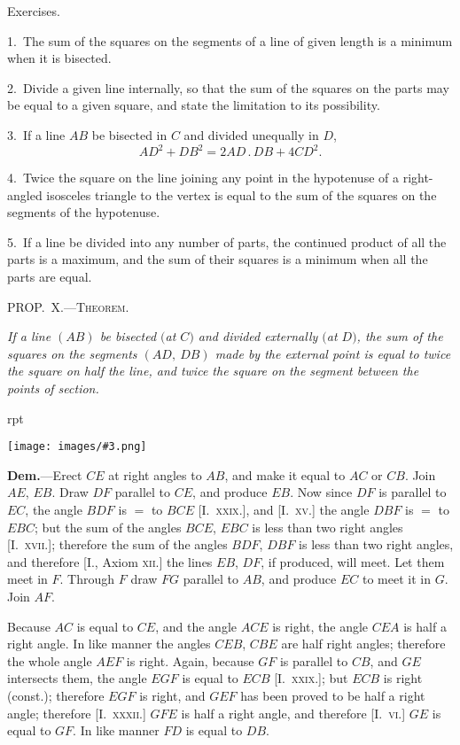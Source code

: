 \documentclass[oneside]{book}
\newcounter{wrapwidth}
\newcommand\mypropl[2]{
\bigskip\Needspace*{4\baselineskip}\begin{center}\textsc{#1}\end{center}
\hspace{\parindent}\emph{#2}\par\medskip
}
\newcommand\exhead[1]{
\Needspace*{5\baselineskip}\begin{center}
\textsf{#1}
\end{center}
}
\newcommand\imgflow[3]{
\setcounter{wrapwidth}{#1}
\begin{wrapfigure}[#2]{r}{\value{wrapwidth}pt}
\begin{center}
\vspace{-0.3in}
\texttt{[image: images/\#3.png]}
\end{center}
\end{wrapfigure}
}
\begin{document}


\exhead{Exercises.}

\begin{footnotesize}
1.~The sum of the squares on the segments of a line of given
length is a minimum when it is bisected.

2.~Divide a given line internally, so that the sum of the squares
on the parts may be equal to a given square, and state the limitation
to its possibility.

3.~If a line $AB$ be bisected in $C$ and divided unequally in $D$,
\[
  AD^2 + DB^2 =  2AD\,.\,DB + 4CD^2.
\]

4.~Twice the square on the line joining any point in the hypotenuse
of a right-angled isosceles triangle to the vertex is equal to
the sum of the squares on the segments of the hypotenuse.

5.~If a line be divided into any number of parts, the continued
product of all the parts is a maximum, and the sum of their squares
is a minimum when all the parts are equal.
\par\end{footnotesize}


\mypropl{PROP\@.~X.---Theorem.}{If a line $(AB)$ be bisected $($at $C)$ and divided externally
$($at $D)$, the sum of the squares on the segments $(AD,\ DB)$
made by the external point is equal to twice the square on
half the line, and twice the square on the segment between
the points of section.}

\imgflow{184}{11}{f092}

\textbf{Dem.}---Erect $CE$ at right angles to $AB$, and make
it equal to $AC$ or $CB$.
Join $AE$, $EB$. Draw
$DF$ parallel to $CE$, and
produce $EB$. Now
since $DF$ is parallel to
$EC$, the angle $BDF$ is
$=$ to $BCE$ [I.\ \textsc{xxix}.],
and [I.\ \textsc{xv}.] the angle
$DBF$ is $=$ to $EBC$;
but the sum of the
angles $BCE$, $EBC$ is
less than two right angles [I.\ \textsc{xvii}.]; therefore the sum
of the angles $BDF$, $DBF$ is less than two right angles,
and therefore [I., Axiom \textsc{xii}.] the lines $EB$, $DF$, if produced,
will meet. Let them meet in $F$. Through $F$
draw $FG$ parallel to $AB$, and produce $EC$ to meet it in
$G$. Join $AF$.

Because $AC$ is equal to $CE$, and the angle $ACE$ is right,
the angle $CEA$ is half a right angle. In like manner
the angles $CEB$, $CBE$ are half right angles; therefore
the whole angle $AEF$ is right. Again, because $GF$
is parallel to $CB$, and $GE$ intersects them, the angle $EGF$
is equal to $ECB$ [I.\ \textsc{xxix}.]; but $ECB$ is right (const.);
therefore $EGF$ is right, and $GEF$ has been proved to
be half a right angle; therefore [I.\ \textsc{xxxii}.] $GFE$ is
half a right angle, and therefore [I.\ \textsc{vi}.] $GE$ is equal
to $GF$. In like manner $FD$ is equal to $DB$.
\end{document}
